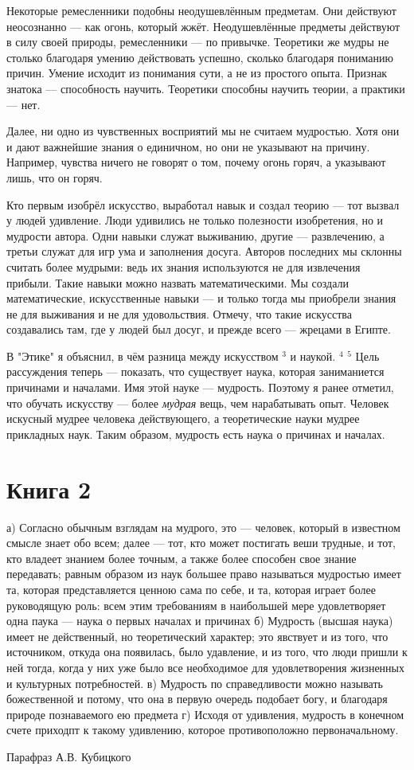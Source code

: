 \documentclass[oneside, 17pt, dvipsnames]{extbook}
\begin{document}
Некоторые ремесленники подобны неодушевлённым предметам. Они действуют неосознанно --- как огонь, который жжёт. Неодушевлённые предметы действуют в силу своей природы, ремесленники --- по привычке. Теоретики же мудры не столько благодаря умению действовать успешно, сколько благодаря пониманию причин. Умение исходит из понимания сути, а не из простого опыта. Признак знатока --- способность научить. Теоретики способны научить теории, а практики --- нет.

Далее, ни одно из чувственных восприятий мы не считаем мудростью. Хотя они и дают важнейшие знания о единичном, но они не указывают на причину. Например, чувства ничего не говорят о том, почему огонь горяч, а указывают лишь, что он горяч.

Кто первым изобрёл искусство, выработал навык и создал теорию --- тот вызвал у людей удивление. Люди удивились не только полезности изобретения, но и мудрости автора. Одни навыки служат выживанию, другие --- развлечению, а третьи служат для игр ума и заполнения досуга. Авторов последних мы склонны считать более мудрыми: ведь их знания используются не для извлечения прибыли. Такие навыки можно назвать математическими. Мы создали математические, искусственные навыки --- и только тогда мы приобрели знания не для выживания и не для удовольствия. Отмечу, что такие искусства создавались там, где у людей был досуг, и прежде всего --- жрецами в Египте.

В "Этике" я объяснил, в чём разница между искусством $^3$ и наукой. $^4$ $^5$ Цель рассуждения теперь --- показать, что существует наука, которая заниманиется причинами и началами. Имя этой науке --- мудрость. Поэтому я ранее отметил, что обучать искусству --- более \textit{мудрая} вещь, чем нарабатывать опыт. Человек искусный мудрее человека действующего, а теоретические науки мудрее прикладных наук. Таким образом, мудрость есть наука о причинах и началах.



\newpage
\section{Книга 2}

\epigraph{
а) Согласно обычным взглядам на мудрого, это --- человек, который в известном смысле знает обо всем; далее --- тот, кто может постигать веши трудные, и тот, кто владеет знанием более точным, а также более способен свое знание передавать; равным образом из наук большее право называться мудростью имеет та, которая представляется ценною сама по себе, и та, которая играет более руководящую роль: всем этим требованиям в наибольшей мере удовлетворяет одна паука --- наука о первых началах и причинах
б) Мудрость (высшая наука) имеет не действенный, но теоретический характер; это явствует и из того, что источником, откуда она появилась, было удавление, и из того, что люди пришли к ней тогда, когда у них уже было все необходимое для удовлетворения жизненных и культурных потребностей.
в) Мудрость по справедливости можно называть божественной и потому, что она в первую очередь подобает богу, и благодаря природе познаваемого ею предмета
г) Исходя от удивления, мудрость в конечном счете приходпт к такому удивлению, которое противоположно первоначальному.
}{Парафраз А.В. Кубицкого}
\end{document}
